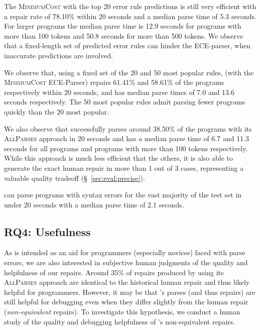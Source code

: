 The \textsc{MinimumCost} with the top 20 error rule predictions is still very
efficient with a repair rate of 78.10\% within 20 seconds and a median parse
time of 5.3 seconds. For larger programs the median parse time is 12.9 seconds
for programs with more than 100 tokens and 50.8 seconds for more than 500
tokens. We observe that a fixed-length set of predicted error rules can hinder
the ECE-parser, when inaccurate predictions are involved.

We observe that, using a fixed set of the 20 and 50 most popular rules,
\toolname (with the \textsc{MinimumCost} ECE-Parser) repairs 61.41\% and 58.61\%
of the programs respectively within 20 seconds, and has median parse times of
7.0 and 13.6 seconds respectively. The 50 most popular rules admit parsing fewer
programs quickly than the 20 most popular.

We also observe that \toolname successfully parses around 38.50\% of the
programs with its \textsc{AllParses} approach in 20 seconds and has a median
parse time of 6.7 and 11.3 seconds for all programs and programs with more than
100 tokens respectively. While this approach is much less efficient that the
others, it is also able to generate the exact human repair in more than 1 out of
3 cases, representing a valuable quality tradeoff (\S~\ref{sec:eval:precise}).

\begin{framed}
  \noindent \toolname can parse programs with syntax errors for the vast
  majority of the test set in under 20 seconds with a median parse time of 2.1
  seconds.
\end{framed}

\subsection{RQ4: Usefulness}
\label{sec:eval:useful}


As \toolname is intended as an aid for programmers (especially novices) faced
with parse errors, we are also interested in subjective human judgments of the
quality and helpfulness of our repairs. Around 35\% of repairs produced by
\toolname using its \textsc{AllParses} approach are identical to the historical
human repair and thus likely helpful for programmers. However, it may be that
\toolname's parses (and thus repairs) are still helpful for debugging even when
they differ slightly from the human repair (\ie \textit{non-equivalent}
repairs). To investigate this hypothesis, we conduct a human study of the
quality and debugging helpfulness of \toolname's non-equivalent repairs.

